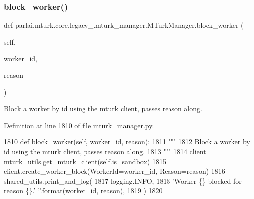 \subsubsection{\texorpdfstring{block\+\_\+worker()}{block\_worker()}}
{\footnotesize\ttfamily def parlai.\+mturk.\+core.\+legacy\+\_.\+mturk\+\_\+manager.\+M\+Turk\+Manager.\+block\+\_\+worker (\begin{DoxyParamCaption}\item[{}]{self,  }\item[{}]{worker\+\_\+id,  }\item[{}]{reason }\end{DoxyParamCaption})}

\begin{DoxyVerb}Block a worker by id using the mturk client, passes reason along.
\end{DoxyVerb}
 

Definition at line 1810 of file mturk\+\_\+manager.\+py.


\begin{DoxyCode}
1810     \textcolor{keyword}{def }block\_worker(self, worker\_id, reason):
1811         \textcolor{stringliteral}{"""}
1812 \textcolor{stringliteral}{        Block a worker by id using the mturk client, passes reason along.}
1813 \textcolor{stringliteral}{        """}
1814         client = mturk\_utils.get\_mturk\_client(self.is\_sandbox)
1815         client.create\_worker\_block(WorkerId=worker\_id, Reason=reason)
1816         shared\_utils.print\_and\_log(
1817             logging.INFO,
1818             \textcolor{stringliteral}{'Worker \{\} blocked for reason \{\}.'} \textcolor{stringliteral}{''}.\hyperlink{namespaceparlai_1_1chat__service_1_1services_1_1messenger_1_1shared__utils_a32e2e2022b824fbaf80c747160b52a76}{format}(worker\_id, reason),
1819         )
1820 
\end{DoxyCode}
\mbox{\label{classparlai_1_1mturk_1_1core_1_1legacy__2018_1_1mturk__manager_1_1MTurkManager_a8dcdae632395f22e310a4225aadde500}} 

